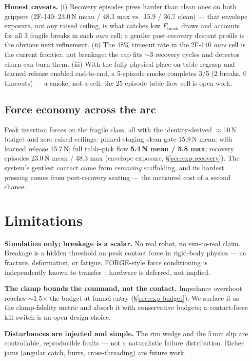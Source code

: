 \documentclass[11pt]{article}
\newcommand{\Fbreak}{\ensuremath{F_{\mathrm{break}}}}
\begin{document}
\textbf{Honest caveats.} (i) Recovery episodes press harder than clean ones on both grippers (2F-140: 23.0\,N mean / 48.3 max vs.\ 15.9 / 36.7 clean) --- that envelope exposure, not any raised ceiling, is what catches low \Fbreak{} draws and accounts for all 3 fragile breaks in each \emph{ours} cell; a gentler post-recovery descent profile is the obvious next refinement. (ii) The 48\% timeout rate in the 2F-140 \emph{ours} cell is the current frontier, not breakage: the cap fits $\sim$3 recovery cycles and detector churn can burn them. (iii) With the fully physical place-on-table regrasp and learned release enabled end-to-end, a 5-episode smoke completes 3/5 (2 breaks, 0 timeouts) --- a smoke, not a cell; the 25-episode table-flow cell is open work.

\subsection{Force economy across the arc}

Peak insertion forces on the fragile class, all with the identity-derived $\approx$10\,N budget and zero raised ceilings: pinned-staging clean gate 15.9\,N mean; with learned release 15.7\,N; full table-pick flow \textbf{5.4\,N mean / 5.8 max}; recovery episodes 23.0\,N mean / 48.3 max (envelope exposure, \S\ref{sec:exp-recovery}). The system's gentlest contact came from \emph{removing} scaffolding, and its hardest pressing comes from post-recovery seating --- the measured cost of a second chance.

\section{Limitations}
\label{sec:limitations}

\textbf{Simulation only; breakage is a scalar.} No real robot, no sim-to-real claim. Breakage is a hidden threshold on peak contact force in rigid-body physics --- no fracture, deformation, or fatigue. FORGE-style force conditioning is independently known to transfer~\citep{noseworthy2025forge}; hardware is deferred, not implied.

\textbf{The clamp bounds the command, not the contact.} Impedance overshoot reaches $\sim$1.5$\times$ the budget at funnel entry (\S\ref{sec:exp-budget}). We surface it as the clamp-fidelity metric and absorb it with conservative budgets; a contact-force kill switch is an open design choice.

\textbf{Disturbances are injected and simple.} The rim wedge and the 5\,mm slip are controllable, reproducible faults --- not a naturalistic failure distribution. Richer jams (angular catch, burrs, cross-threading) are future work.
\end{document}
